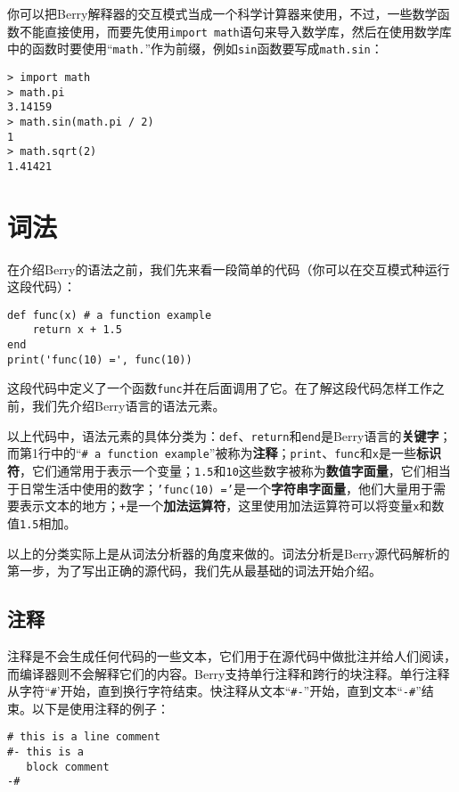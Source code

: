 你可以把Berry解释器的交互模式当成一个科学计算器来使用，不过，一些数学函数不能直接使用，而要先使用\texttt{import math}语句来导入数学库，然后在使用数学库中的函数时要使用``\texttt{math.}''作为前缀，例如\texttt{sin}函数要写成\texttt{math.sin}：
\begin{lstlisting}[language=berry, numbers=none]
> import math
> math.pi
3.14159
> math.sin(math.pi / 2)
1
> math.sqrt(2)
1.41421
\end{lstlisting}

\section{词法}

在介绍Berry的语法之前，我们先来看一段简单的代码（你可以在交互模式种运行这段代码）：
\begin{lstlisting}[language=berry]
def func(x) # a function example
    return x + 1.5
end
print('func(10) =', func(10))
\end{lstlisting}

这段代码中定义了一个函数\texttt{func}并在后面调用了它。在了解这段代码怎样工作之前，我们先介绍Berry语言的语法元素。

以上代码中，语法元素的具体分类为：\texttt{def}、\texttt{return}和\texttt{end}是Berry语言的\textbf{关键字}；而第1行中的``\texttt{\# a function example}''被称为\textbf{注释}；\texttt{print}、\texttt{func}和\texttt{x}是一些\textbf{标识符}，它们通常用于表示一个变量；\texttt{1.5}和\texttt{10}这些数字被称为\textbf{数值字面量}，它们相当于日常生活中使用的数字；\texttt{'func(10) ='}是一个\textbf{字符串字面量}，他们大量用于需要表示文本的地方；\texttt{+}是一个\textbf{加法运算符}，这里使用加法运算符可以将变量\texttt{x}和数值\texttt{1.5}相加。

以上的分类实际上是从词法分析器的角度来做的。词法分析是Berry源代码解析的第一步，为了写出正确的源代码，我们先从最基础的词法开始介绍。

\subsection{注释}

注释是不会生成任何代码的一些文本，它们用于在源代码中做批注并给人们阅读，而编译器则不会解释它们的内容。Berry支持单行注释和跨行的块注释。单行注释从字符``\texttt{\#}'开始，直到换行字符结束。快注释从文本``\texttt{\#-}''开始，直到文本``\texttt{-\#}''结束。以下是使用注释的例子：
\begin{lstlisting}[language=berry, numbers=none]
# this is a line comment
#- this is a
   block comment
-#
\end{lstlisting}

